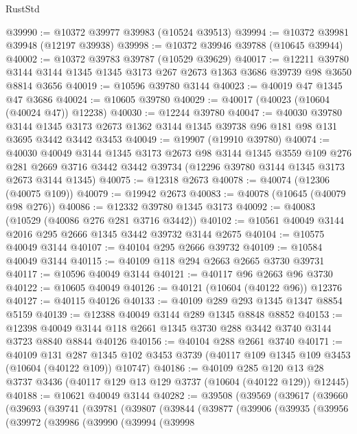 \begin{lexlean}{RustStd}
\begin{coremodule}
@39990 := @10372 @39977 @39983 (@10524 @39513)
@39994 := @10372 @39981 @39948 (@12197 @39938)
@39998 := @10372 @39946 @39788 (@10645 @39944)
@40002 := @10372 @39783 @39787 (@10529 @39629)
@40017 := @12211
    @39780
    @3144
    @3144
    @1345
    @1345
    @3173
    @267
    @2673
    @1363
    @3686
    @39739
    @98
    @3650
    @8814
    @3656
@40019 := @10596 @39780 @3144
@40023 := @40019 @47 @1345 @47 @3686
@40024 := @10605 @39780
@40029 := @40017 (@40023 (@10604 (@40024 @47)) @12238)
@40030 := @12244 @39780
@40047 := @40030
    @39780
    @3144
    @1345
    @3173
    @2673
    @1362
    @3144
    @1345
    @39738
    @96
    @181
    @98
    @131
    @3695
    @3442
    @3442
    @3453
@40049 := @19907 (@19910 @39780)
@40074 := @40030
    @40049
    @3144
    @1345
    @3173
    @2673
    @98
    @3144
    @1345
    @3559
    @109
    @276
    @281
    @2669
    @3716
    @3442
    @3442
    @39734
    (@12296 @39780 @3144 @1345 @3173 @2673 @3144 @1345)
@40075 := @12318 @2673
@40078 := @40074 (@12306 (@40075 @109))
@40079 := @19942 @2673
@40083 := @40078 (@10645 (@40079 @98 @276))
@40086 := @12332 @39780 @1345 @3173
@40092 := @40083 (@10529 (@40086 @276 @281 @3716 @3442))
@40102 := @10561 @40049 @3144 @2016 @295 @2666 @1345 @3442 @39732 @3144 @2675
@40104 := @10575 @40049 @3144
@40107 := @40104 @295 @2666 @39732
@40109 := @10584 @40049 @3144
@40115 := @40109 @118 @294 @2663 @2665 @3730 @39731
@40117 := @10596 @40049 @3144
@40121 := @40117 @96 @2663 @96 @3730
@40122 := @10605 @40049
@40126 := @40121 (@10604 (@40122 @96)) @12376
@40127 := @40115 @40126
@40133 := @40109 @289 @293 @1345 @1347 @8854 @5159
@40139 := @12388 @40049 @3144 @289 @1345 @8848 @8852
@40153 := @12398 @40049 @3144 @118 @2661 @1345 @3730 @288 @3442 @3740 @3144 @3723 @8840 @8844 @40126
@40156 := @40104 @288 @2661 @3740
@40171 := @40109
    @131
    @287
    @1345
    @102
    @3453
    @3739
    (@40117 @109 @1345 @109 @3453 (@10604 (@40122 @109)) @10747)
@40186 := @40109
    @285
    @120
    @13
    @28
    @3737
    @3436
    (@40117 @129 @13 @129 @3737 (@10604 (@40122 @129)) @12445)
@40188 := @10621 @40049 @3144
@40282 := @39508
    (@39569
      (@39617
        (@39660
          (@39693
            (@39741
              (@39781
                (@39807
                  (@39844
                    (@39877
                      (@39906
                        (@39935
                          (@39956
                            (@39972
                              (@39986
                                (@39990
                                  (@39994
                                    (@39998

\end{coremodule}
\end{lexlean}
